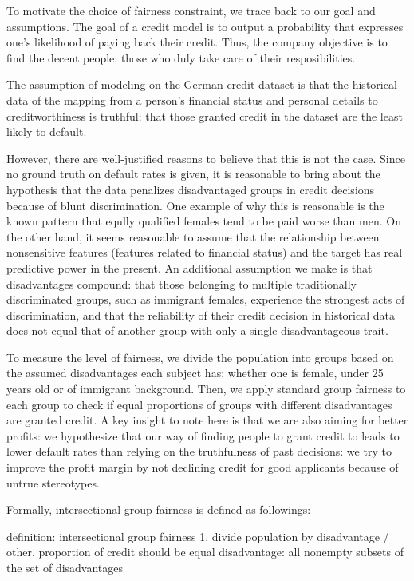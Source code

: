 \documentclass{article}
\begin{document}
To motivate the choice of fairness constraint, we trace back to our goal and assumptions.
 The goal of a credit model is to output a probability that 
expresses one's likelihood of paying back their credit. Thus, the company objective is to find 
the decent people: those who duly take care of their resposibilities.

The assumption of modeling on the German credit dataset is that the historical data of the mapping from a person's financial status and personal details
to creditworthiness is truthful: that those granted credit in the dataset are the least likely to default.

However, there are well-justified reasons to believe that this is not the case.
Since no ground truth on default rates is given, it is reasonable to bring about the hypothesis that
the data penalizes disadvantaged groups in credit decisions because of blunt discrimination.
One example of why this is reasonable is the known pattern that eqully qualified females tend to be paid worse 
than men. On the other hand, it seems reasonable to assume that the relationship between nonsensitive
features (features related to financial status) and the target has real predictive power in the present.
An additional assumption we make is that disadvantages compound: that those belonging to multiple traditionally 
discriminated groups, such as immigrant females, experience the strongest acts of discrimination, and that the
reliability of their credit decision in historical data does not equal that of another group with only a single 
disadvantageous trait.

To measure the level of fairness, we divide the population 
into groups based on the assumed disadvantages each subject has: whether one is female, under 25 years old or of immigrant background. Then, we apply standard group fairness
to each group to check if equal proportions of groups with different disadvantages are granted credit. 
A key insight to note here is that we are also aiming for better profits:
 we hypothesize that our way of finding people to grant 
credit to leads to lower default rates than relying on the truthfulness of 
past decisions: we try to improve the profit margin by 
not declining credit for good applicants because of untrue stereotypes.

Formally, intersectional group fairness is defined as followings:

definition: intersectional group fairness 
1. divide population by disadvantage / other. proportion of credit should be equal
disadvantage: all nonempty subsets of the set of disadvantages
\end{document}
